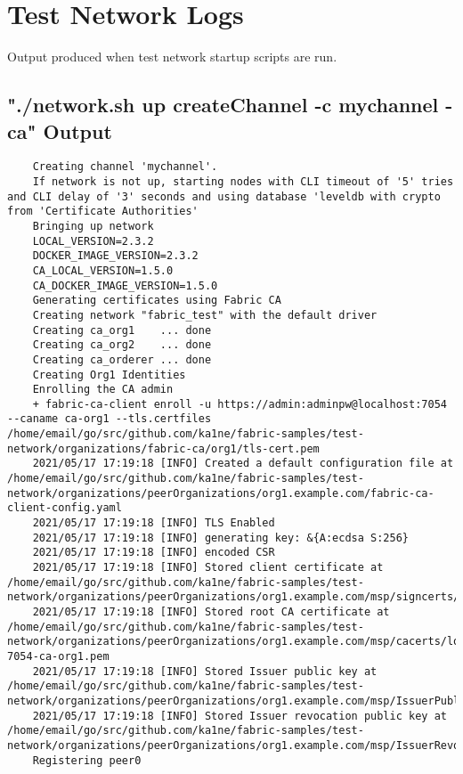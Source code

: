 \section{Test Network Logs}
Output produced when test network startup scripts are run. \label{appendix:testnetlogs}

\subsection{"./network.sh up createChannel -c mychannel -ca" Output}
\begin{lstlisting}
    Creating channel 'mychannel'.
    If network is not up, starting nodes with CLI timeout of '5' tries and CLI delay of '3' seconds and using database 'leveldb with crypto from 'Certificate Authorities'
    Bringing up network
    LOCAL_VERSION=2.3.2
    DOCKER_IMAGE_VERSION=2.3.2
    CA_LOCAL_VERSION=1.5.0
    CA_DOCKER_IMAGE_VERSION=1.5.0
    Generating certificates using Fabric CA
    Creating network "fabric_test" with the default driver
    Creating ca_org1    ... done
    Creating ca_org2    ... done
    Creating ca_orderer ... done
    Creating Org1 Identities
    Enrolling the CA admin
    + fabric-ca-client enroll -u https://admin:adminpw@localhost:7054 --caname ca-org1 --tls.certfiles /home/email/go/src/github.com/ka1ne/fabric-samples/test-network/organizations/fabric-ca/org1/tls-cert.pem
    2021/05/17 17:19:18 [INFO] Created a default configuration file at /home/email/go/src/github.com/ka1ne/fabric-samples/test-network/organizations/peerOrganizations/org1.example.com/fabric-ca-client-config.yaml
    2021/05/17 17:19:18 [INFO] TLS Enabled
    2021/05/17 17:19:18 [INFO] generating key: &{A:ecdsa S:256}
    2021/05/17 17:19:18 [INFO] encoded CSR
    2021/05/17 17:19:18 [INFO] Stored client certificate at /home/email/go/src/github.com/ka1ne/fabric-samples/test-network/organizations/peerOrganizations/org1.example.com/msp/signcerts/cert.pem
    2021/05/17 17:19:18 [INFO] Stored root CA certificate at /home/email/go/src/github.com/ka1ne/fabric-samples/test-network/organizations/peerOrganizations/org1.example.com/msp/cacerts/localhost-7054-ca-org1.pem
    2021/05/17 17:19:18 [INFO] Stored Issuer public key at /home/email/go/src/github.com/ka1ne/fabric-samples/test-network/organizations/peerOrganizations/org1.example.com/msp/IssuerPublicKey
    2021/05/17 17:19:18 [INFO] Stored Issuer revocation public key at /home/email/go/src/github.com/ka1ne/fabric-samples/test-network/organizations/peerOrganizations/org1.example.com/msp/IssuerRevocationPublicKey
    Registering peer0

\end{lstlisting}
